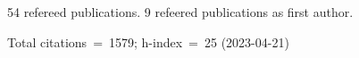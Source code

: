 54 refereed publications. 9 refeered publications as first author.

Total citations~=~1579; h-index~=~25 (2023-04-21)